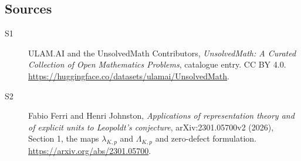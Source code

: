 \documentclass[11pt]{article}
\begin{document}
\subsection{Sources}
\begin{description}
\item[\hypertarget{source:statement:1}{S1}] ULAM.AI and the UnsolvedMath Contributors, \emph{UnsolvedMath: A Curated Collection of Open Mathematics Problems}, catalogue entry. CC BY 4.0. \url{https://huggingface.co/datasets/ulamai/UnsolvedMath}.
\item[\hypertarget{source:statement:2}{S2}] Fabio Ferri and Henri Johnston, \emph{Applications of representation theory and of explicit units to Leopoldt's conjecture}, arXiv:2301.05700v2 (2026), Section 1, the maps $\lambda_{K,p}$ and $\Lambda_{K,p}$ and zero-defect formulation. \url{https://arxiv.org/abs/2301.05700}.
\end{description}
\label{end:statement}
\end{document}
